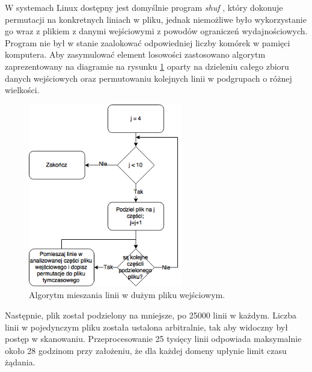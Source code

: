 W systemach Linux dostępny jest domyślnie program \textit{shuf} \cite{shuf}, który dokonuje permutacji na konkretnych liniach w pliku,
jednak niemożliwe było wykorzystanie go wraz z plikiem z danymi wejściowymi z powodów ograniczeń wydajnościowych. Program nie był w
stanie zaalokować odpowiedniej liczby komórek w pamięci komputera. Aby zasymulować element losowości zastosowano algorytm zaprezentowany
na diagramie na rysunku \ref{fig:shufAlgorithm} oparty na dzieleniu całego zbioru danych wejściowych oraz permutowaniu kolejnych linii
w podgrupach o różnej wielkości.

\begin{figure}[ht]
	\centering
	\includegraphics[width=0.6\textwidth]{image/sfuh}
	\caption{Algorytm mieszania linii w dużym pliku wejściowym.}
	\label{fig:shufAlgorithm}
\end{figure}

Następnie, plik został podzielony na mniejsze, po 25000 linii w każdym. Liczba linii w pojedynczym pliku została ustalona arbitralnie,
tak aby widoczny był postęp w skanowaniu. Przeprocesowanie 25 tysięcy linii odpowiada maksymalnie około 28 godzinom przy założeniu,
że dla każdej domeny upłynie limit czasu żądania.

